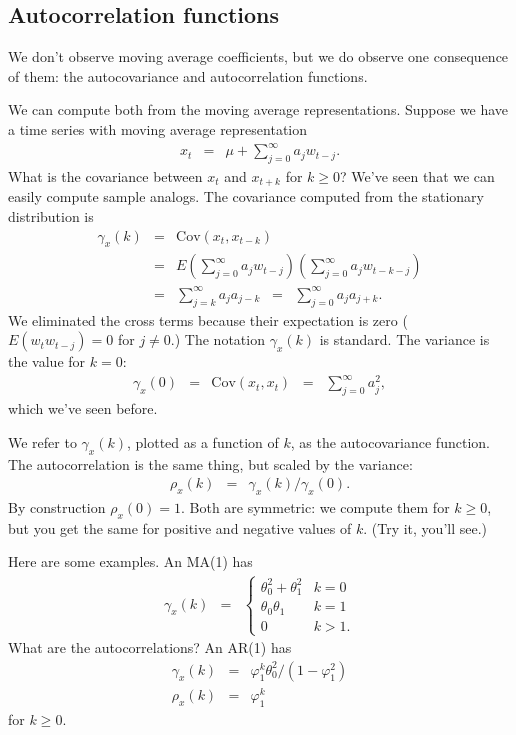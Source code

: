 \documentclass[11pt]{article}
\begin{document}
\subsection*{Autocorrelation functions}

We don't observe moving average coefficients,
but we do observe one consequence of them:
the autocovariance and autocorrelation functions.


We can compute both from the moving average representations.
Suppose we have a time series with moving average representation
\begin{eqnarray*}
    x_t &=& \mu + \sum_{j=0}^\infty a_j w_{t-j} .
\end{eqnarray*}
What is the covariance between $x_t$ and $x_{t+k}$ for $k \geq 0$?
We've seen that we can easily compute sample analogs.
The covariance computed from the stationary distribution is
\begin{eqnarray*}
    \gamma_x(k)  &=& \mbox{Cov} (x_t,x_{t-k}) \\
               &=&  E \left( \sum_{j=0}^\infty a_j w_{t-j} \right)
                  \left( \sum_{j=0}^\infty a_j w_{t-k-j} \right) \\
                &=&   \sum_{j=k}^\infty a_j a_{j-k}
                \;\;=\;\; \sum_{j=0}^\infty a_j a_{j+k} .
\end{eqnarray*}
We eliminated the cross terms because their expectation is zero
($E (w_t w_{t-j}) = 0$ for $j\neq 0$.)
The notation $\gamma_x(k)$ is standard.
The variance is the value for $k=0$:
\begin{eqnarray*}
    \gamma_x(0)  &=& \mbox{Cov} (x_t,x_{t})
                \;\;=\;\;   \sum_{j=0}^\infty a_j^2  ,
\end{eqnarray*}
which we've seen before.

We refer to $\gamma_x(k)$, plotted as a function of $k$,
as the autocovariance function.
The autocorrelation is the same thing, but scaled by the variance:
\begin{eqnarray*}
    \rho_x(k)  &=& \gamma_x(k)/\gamma_x(0) .
\end{eqnarray*}
By construction $\rho_x(0) = 1$.
Both are symmetric:  we compute them for $k\geq 0$,
but you get the same for positive and negative values of $k$.
(Try it, you'll see.)


Here are some examples.
An MA(1) has
\begin{eqnarray*}
    \gamma_x(k) &=&
            \left\{
            \begin{array}{ll}
            \theta_0^2 + \theta_1^2 & k=0 \\
            \theta_0\theta_1  & k=1 \\
            0       &  k > 1 .
            \end{array}
            \right.
\end{eqnarray*}
What are the autocorrelations?
An AR(1) has
\begin{eqnarray*}
    \gamma_x(k) &=& \varphi_1^k \theta_0^2/(1-\varphi_1^2) \\
    \rho_x(k)   &=& \varphi_1^k
\end{eqnarray*}
for $k \geq 0$.
\end{document}

